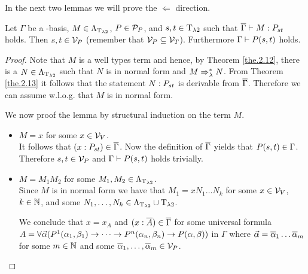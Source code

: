 In the next two lemmas we will prove the $\Leftarrow$ direction.

\begin{lemma}\label{lem.4.3}
Let $\Gamma$ be a \SysP-basis, $M\in\Lambda_{\text{T}_{\lambda2}}$, $P\in\mathcal{P}_P$, and $\predTFst,\predTSnd\in\lambdaTypes$ such that $\trans{\Gamma}\lambdaModels M:\code{P}{\predTFst}{\predTSnd}$ holds.
Then $\predTFst, \predTSnd\in\VarP$ (remember that $\mathcal{V}_P\subseteq\mathcal{V}_T$). Furthermore $\Gamma\PModels P(\predTFst,\predTSnd)$ holds.
\end{lemma}
\begin{proof}
Note that $M$ is a well types \lambdaTwo{} term and hence, by Theorem \ref{the.2.12}, there is a $N\in\Lambda_{\text{T}_{\lambda2}}$ such that $N$ is in normal form and $M\Rightarrow_\lambda^*N$. From Theorem \ref{the.2.13} it follows that the statement $N:\code{P}{\predTFst}{\predTSnd}$ is derivable from $\overline{\Gamma}$. Therefore we can assume w.l.o.g. that $M$ is in normal form.

We now proof the lemma by structural induction on the term $M$.
\begin{itemize}
	\item[] \underline{$M=x$} for some $x\in\mathcal{V}_V$.\\
		It follows that $(x:\code{P}{\predTFst}{\predTSnd})\in\trans{\Gamma}$.
		Now the definition of $\overline{\Gamma}$ yields that $P(\predTFst,\predTSnd)\in\Gamma$. Therefore $\predTFst,\predTSnd\in\VarP$ and $\Gamma\vdash P(s,t)$ holds trivially.
	\item[] \underline{$M=M_1M_2$} for some $M_1,M_2\in\Lambda_{\text{T}_{\lambda2}}$.\\
		Since $M$ is in normal form we have that $M_1=xN_1\dots N_k$ for some $x\in\mathcal{V}_V$, $k\in\mathbb{N}$, and some $N_1,\dots,N_k\in\Lambda_{\text{T}_{\lambda2}}\cup\text{T}_{\lambda2}$. %
		
		We conclude that $x=x_A$ and $(x:\overline{A})\in\overline{\Gamma}$ for some universal formula $A=\forall\predVec(P^1(\predFst[1],\predSnd[1])\to\dots\to P^n(\predFst[n],\predSnd[n])\to P(\predFst,\predSnd))$ in $\Gamma$ where $\predVec=\predVec[1]\dots\predVec[m]$ for some $m\in\mathbb{N}$ and some $\predVec[1],\dots,\predVec[m]\in\VarP$.
		

\end{itemize}
\end{proof}
